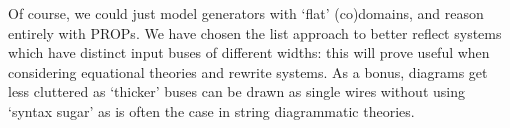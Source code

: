 \begin{remark}
    Of course, we could just model generators with `flat' (co)domains, and
    reason entirely with PROPs.
    We have chosen the list approach to better reflect systems which have
    distinct input buses of different widths: this will prove useful when
    considering equational theories and rewrite systems.
    As a bonus, diagrams get less cluttered as `thicker' buses can be drawn
    as single wires without using `syntax sugar' as is often the case in string
    diagrammatic theories.
\end{remark}